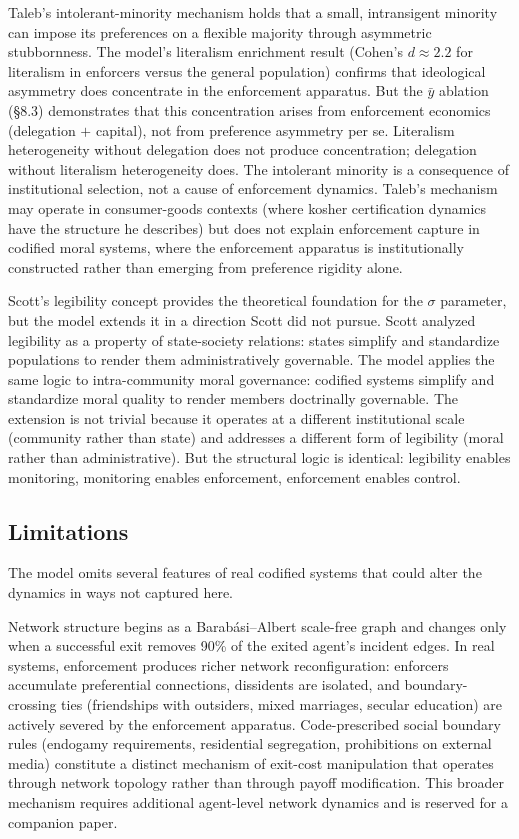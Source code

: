 \documentclass[12pt]{article}
\begin{document}
Taleb's \cite{taleb2018} intolerant-minority mechanism holds that a small, intransigent minority can impose its preferences on a flexible majority through asymmetric stubbornness. The model's literalism enrichment result (Cohen's $d \approx 2.2$ for literalism in enforcers versus the general population) confirms that ideological asymmetry does concentrate in the enforcement apparatus. But the $\bar{y}$ ablation (\S8.3) demonstrates that this concentration arises from enforcement economics (delegation $+$ capital), not from preference asymmetry per se. Literalism heterogeneity without delegation does not produce concentration; delegation without literalism heterogeneity does. The intolerant minority is a consequence of institutional selection, not a cause of enforcement dynamics. Taleb's mechanism may operate in consumer-goods contexts (where kosher certification dynamics have the structure he describes) but does not explain enforcement capture in codified moral systems, where the enforcement apparatus is institutionally constructed rather than emerging from preference rigidity alone.

Scott's legibility concept provides the theoretical foundation for the $\sigma$ parameter, but the model extends it in a direction Scott did not pursue. Scott analyzed legibility as a property of state-society relations: states simplify and standardize populations to render them administratively governable. The model applies the same logic to intra-community moral governance: codified systems simplify and standardize moral quality to render members doctrinally governable. The extension is not trivial because it operates at a different institutional scale (community rather than state) and addresses a different form of legibility (moral rather than administrative). But the structural logic is identical: legibility enables monitoring, monitoring enables enforcement, enforcement enables control.

\subsection{Limitations}

The model omits several features of real codified systems that could alter the dynamics in ways not captured here.

Network structure begins as a Barab\'asi--Albert scale-free graph and changes only when a successful exit removes 90\% of the exited agent's incident edges. In real systems, enforcement produces richer network reconfiguration: enforcers accumulate preferential connections, dissidents are isolated, and boundary-crossing ties (friendships with outsiders, mixed marriages, secular education) are actively severed by the enforcement apparatus. Code-prescribed social boundary rules (endogamy requirements, residential segregation, prohibitions on external media) constitute a distinct mechanism of exit-cost manipulation that operates through network topology rather than through payoff modification. This broader mechanism requires additional agent-level network dynamics and is reserved for a companion paper.
\end{document}
